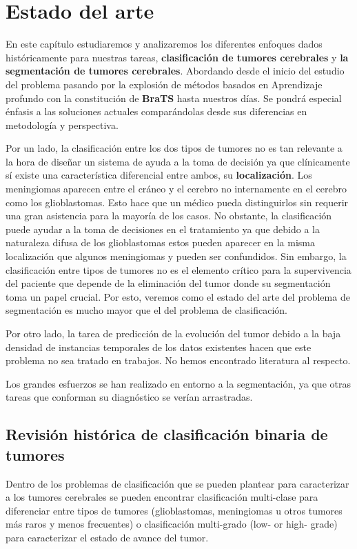 \chapter{Estado del arte}

En este capítulo estudiaremos y analizaremos los diferentes enfoques dados históricamente para nuestras tareas, \textbf{clasificación de tumores cerebrales} y \textbf{la segmentación de tumores cerebrales}. Abordando desde el inicio del estudio del problema pasando por la explosión de métodos basados en Aprendizaje profundo con la constitución de \textbf{BraTS} hasta nuestros días. Se pondrá especial énfasis a las soluciones actuales comparándolas desde sus diferencias en metodología y perspectiva.

Por un lado, la clasificación entre los dos tipos de tumores no es tan relevante a la hora de diseñar un sistema de ayuda a la toma de decisión ya que clínicamente sí existe una característica diferencial entre ambos, su \textbf{localización}. Los meningiomas aparecen entre el cráneo y el cerebro no internamente en el cerebro como los glioblastomas. Esto hace que un médico pueda distinguirlos sin requerir una gran asistencia para la mayoría de los casos. No obstante, la clasificación puede ayudar a la toma de decisiones en el tratamiento ya que debido a la naturaleza difusa de los glioblastomas estos pueden aparecer en la misma localización que algunos meningiomas y pueden ser confundidos. Sin embargo, la clasificación entre tipos de tumores no es el elemento crítico para la supervivencia del paciente que depende de la eliminación del tumor donde su segmentación toma un papel crucial. Por esto, veremos como el estado del arte del problema de segmentación es mucho mayor que el del problema de clasificación.

Por otro lado, la tarea de predicción de la evolución del tumor debido a la baja densidad de instancias temporales de los datos existentes hacen que este problema no sea tratado en trabajos. No hemos encontrado literatura al respecto. 

Los grandes esfuerzos se han realizado en entorno a la segmentación, ya que otras tareas que conforman su diagnóstico se verían arrastradas.

\section{Revisión histórica de clasificación binaria de tumores}

Dentro de los problemas de clasificación que se pueden plantear para caracterizar a los tumores cerebrales se pueden encontrar clasificación multi-clase para diferenciar entre tipos de tumores (glioblastomas, meningiomas u otros tumores más raros y menos frecuentes) o clasificación multi-grado (low- or high- grade) para caracterizar el estado de avance del tumor.

